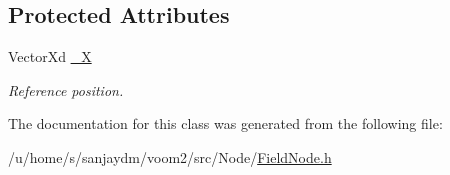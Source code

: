 \subsection*{Protected Attributes}
\begin{DoxyCompactItemize}
\item 
\hypertarget{classvoom_1_1_field_node_aa0eecce8de1392ac78a8b194ef9dfdcb}{
VectorXd \hyperlink{classvoom_1_1_field_node_aa0eecce8de1392ac78a8b194ef9dfdcb}{\_\-X}}
\label{classvoom_1_1_field_node_aa0eecce8de1392ac78a8b194ef9dfdcb}

\begin{DoxyCompactList}\small\item\em Reference position. \item\end{DoxyCompactList}\end{DoxyCompactItemize}


The documentation for this class was generated from the following file:\begin{DoxyCompactItemize}
\item 
/u/home/s/sanjaydm/voom2/src/Node/\hyperlink{_field_node_8h}{FieldNode.h}\end{DoxyCompactItemize}
